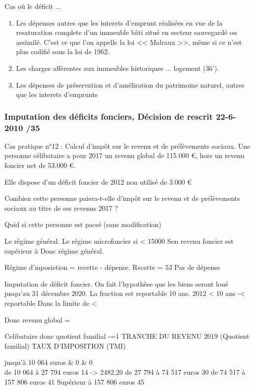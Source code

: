 			Cas où le déficit ...
			\begin{enumerate}
				\item Les dépenses autres que les interets d'emprunt réalisées en vue de la resaturation complete d'un immeuble bâti situé en secteur sauvegardé ou assimilé. C'est ce que l'on appelle la loi << Malraux >>, même si ce n'est plus codifié sous la loi de 1962.
				\item Les charges afférentes aux immeubles historiques ... logement (36').
				\item Les dépenses de préservation et d'améliration du patrimoine naturel, autres que les interets d'emprunts
			\end{enumerate}


		\subsubsection{Imputation des déficits fonciers, Décision de rescrit 22-6-2010 /35}

		\begin{casPratique}{%
			Cas pratique n°12 : Calcul d’impôt sur le revenu et de prélèvements sociaux.}
			Une personne célibataire a pour 2017 un revenu global de 115.000 €, hors un revenu foncier net de 53.000 €.

			Elle dispose d’un déficit foncier de 2012 non utilisé de 3.000 €

			Combien cette personne paiera-t-elle d’impôt sur le revenu et de prélèvements sociaux au titre de ses revenus 2017 ?

			Quid si cette personne est pacsé (sans modification)
		\end{casPratique}
		Le régime général. Le régime microfoncier si < 15000
		Son revenu foncier est supérieur à 
		Donc régime général.

		Régime d'mposietion = recette - dépense.
		Recette = 53
		Pas de dépense

		Imputation de déficit foncier.
		On fait l'hypothèse que les biens seront loué jusqu'au 31 décembre 2020.
		La fraction est reportable 10 ans. 2012 < 10 ans
		-< reportable
		Dans la limite de 
		 < 

		Donc revenu global = 

		Celibataire donc quotient familial -=1
		TRANCHE DU REVENU 2019
(Quotient familial)	TAUX D’IMPOSITION
(TMI)
		\begin{tabular}
		jusqu'à 10 064 euros	& 0 & 0 \\
			de 10 064 à 27 794 euros	14 -> 2482,20
			de 27 794 à 74 517 euros	30 %
			de 74 517 à 157 806 euros 	41 %
			Supérieur à 157 806 euros 	45 %
		\end{tabular}


